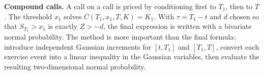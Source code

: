 \begin{techniques}
  \item \textbf{Compound calls.}
  A call on a call is priced by conditioning first to \(T_1\), then to \(T\).
  The threshold \(x_1\) solves \(C(T_1,x_1,T,K)=K_1\).  With
  \(\tau=T_1-t\) and \(d\) chosen so that
  \(S_{T_1}>x_1\) is exactly \(Z>-d\), the final expression is written with a
  bivariate normal probability.
  The method is more important than the final formula: introduce independent
  Gaussian increments for \([t,T_1]\) and \([T_1,T]\), convert each exercise
  event into a linear inequality in the Gaussian variables, then evaluate the
  resulting two-dimensional normal probability.
\end{techniques}
